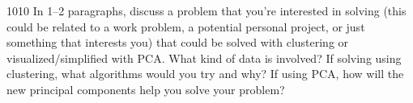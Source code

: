 \documentclass[11pt]{article}
\begin{document}
\begin{studentanswer}[30]
\end{studentanswer}


\begin{problem}{10}{10}
In 1--2 paragraphs, discuss a problem that you’re interested in solving (this could be related to a work problem, a potential personal project, or just something that interests you) that could be solved with clustering or visualized/simplified with PCA. What kind of data is involved? If solving using clustering, what algorithms would you try and why? If using PCA, how will the new principal components help you solve your problem?
\end{problem}

\begin{studentanswer}[20]
\end{studentanswer}
\end{document}
